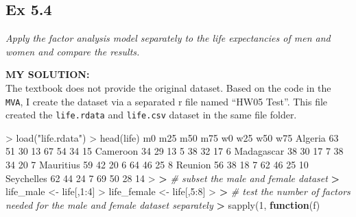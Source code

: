 \documentclass[
]{article}
\newenvironment{Shaded}{\begin{snugshade}}{\end{snugshade}}
\newcommand{\CommentTok}[1]{\textcolor[rgb]{0.56,0.35,0.01}{\textit{#1}}}
\newcommand{\ControlFlowTok}[1]{\textcolor[rgb]{0.13,0.29,0.53}{\textbf{#1}}}
\newcommand{\DecValTok}[1]{\textcolor[rgb]{0.00,0.00,0.81}{#1}}
\newcommand{\ErrorTok}[1]{\textcolor[rgb]{0.64,0.00,0.00}{\textbf{#1}}}
\newcommand{\FunctionTok}[1]{\textcolor[rgb]{0.00,0.00,0.00}{#1}}
\newcommand{\NormalTok}[1]{#1}
\newcommand{\OtherTok}[1]{\textcolor[rgb]{0.56,0.35,0.01}{#1}}
\newcommand{\SpecialCharTok}[1]{\textcolor[rgb]{0.00,0.00,0.00}{#1}}
\newcommand{\StringTok}[1]{\textcolor[rgb]{0.31,0.60,0.02}{#1}}
\begin{document}
\hypertarget{ex-5.4}{%
\subsection{Ex 5.4}\label{ex-5.4}}

\emph{Apply the factor analysis model separately to the life
expectancies of men and women and compare the results.}

\textbf{MY SOLUTION:}\\
The textbook does not provide the original dataset. Based on the code in
the \texttt{MVA}, I create the dataset via a separated r file named
``HW05 Test''. This file created the \texttt{life.rdata} and
\texttt{life.csv} dataset in the same file folder.

\begin{Shaded}
\begin{Highlighting}[]
\SpecialCharTok{\textgreater{}} \FunctionTok{load}\NormalTok{(}\StringTok{"life.rdata"}\NormalTok{)}
\SpecialCharTok{\textgreater{}} \FunctionTok{head}\NormalTok{(life)}
\NormalTok{           m0 m25 m50 m75 w0 w25 w50 w75}
\NormalTok{Algeria    }\DecValTok{63}  \DecValTok{51}  \DecValTok{30}  \DecValTok{13} \DecValTok{67}  \DecValTok{54}  \DecValTok{34}  \DecValTok{15}
\NormalTok{Cameroon   }\DecValTok{34}  \DecValTok{29}  \DecValTok{13}   \DecValTok{5} \DecValTok{38}  \DecValTok{32}  \DecValTok{17}   \DecValTok{6}
\NormalTok{Madagascar }\DecValTok{38}  \DecValTok{30}  \DecValTok{17}   \DecValTok{7} \DecValTok{38}  \DecValTok{34}  \DecValTok{20}   \DecValTok{7}
\NormalTok{Mauritius  }\DecValTok{59}  \DecValTok{42}  \DecValTok{20}   \DecValTok{6} \DecValTok{64}  \DecValTok{46}  \DecValTok{25}   \DecValTok{8}
\NormalTok{Reunion    }\DecValTok{56}  \DecValTok{38}  \DecValTok{18}   \DecValTok{7} \DecValTok{62}  \DecValTok{46}  \DecValTok{25}  \DecValTok{10}
\NormalTok{Seychelles }\DecValTok{62}  \DecValTok{44}  \DecValTok{24}   \DecValTok{7} \DecValTok{69}  \DecValTok{50}  \DecValTok{28}  \DecValTok{14}
\SpecialCharTok{\textgreater{}} 
\ErrorTok{\textgreater{}} \CommentTok{\# subset the male and female dataset}
\ErrorTok{\textgreater{}}\NormalTok{ life\_male }\OtherTok{\textless{}{-}}\NormalTok{ life[,}\DecValTok{1}\SpecialCharTok{:}\DecValTok{4}\NormalTok{]}
\SpecialCharTok{\textgreater{}}\NormalTok{ life\_female }\OtherTok{\textless{}{-}}\NormalTok{ life[,}\DecValTok{5}\SpecialCharTok{:}\DecValTok{8}\NormalTok{]}
\SpecialCharTok{\textgreater{}} 
\ErrorTok{\textgreater{}} \CommentTok{\# test the number of factors needed for the male and female dataset separately}
\ErrorTok{\textgreater{}} \FunctionTok{sapply}\NormalTok{(}\DecValTok{1}\NormalTok{, }\ControlFlowTok{function}\NormalTok{(f)}

\end{Highlighting}
\end{Shaded}
\end{document}
